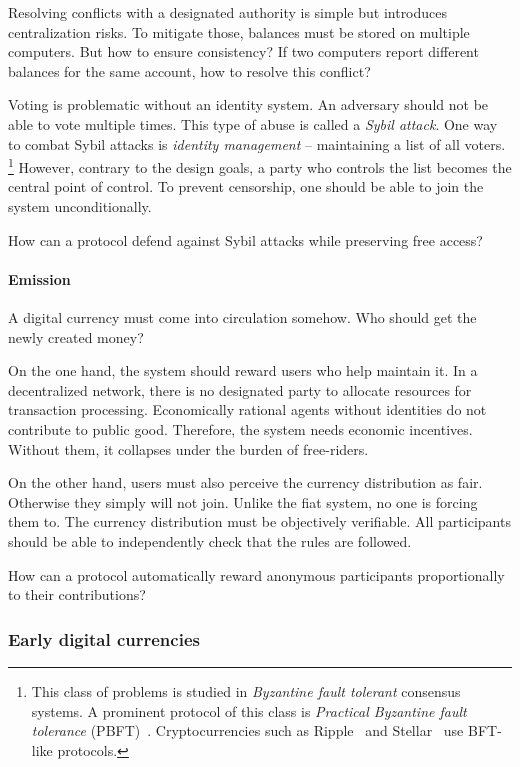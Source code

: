 Resolving conflicts with a designated authority is simple but introduces centralization risks.
To mitigate those, balances must be stored on multiple computers.
But how to ensure consistency?
If two computers report different balances for the same account, how to resolve this conflict?

Voting is problematic without an identity system.
An adversary should not be able to vote multiple times.
This type of abuse is called a \textit{Sybil attack}.
One way to combat Sybil attacks is \textit{identity management} -- maintaining a list of all voters.
\footnote{This class of problems is studied in \textit{Byzantine fault tolerant} consensus systems.
A prominent protocol of this class is \textit{Practical Byzantine fault tolerance} (PBFT)~\cite{Castro2002}.
Cryptocurrencies such as Ripple~\cite{Schwartz2014} and Stellar~\cite{Mazieres2014} use BFT-like protocols.}
However, contrary to the design goals, a party who controls the list becomes the central point of control.
To prevent censorship, one should be able to join the system unconditionally.

How can a protocol defend against Sybil attacks while preserving free access?


\paragraph{Emission}

A digital currency must come into circulation somehow.
Who should get the newly created money?

On the one hand, the system should reward users who help maintain it.
In a decentralized network, there is no designated party to allocate resources for transaction processing.
Economically rational agents without identities do not contribute to public good.
Therefore, the system needs economic incentives.
Without them, it collapses under the burden of free-riders.

On the other hand, users must also perceive the currency distribution as fair.
Otherwise they simply will not join.
Unlike the fiat system, no one is forcing them to.
The currency distribution must be objectively verifiable.
All participants should be able to independently check that the rules are followed.

How can a protocol automatically reward anonymous participants proportionally to their contributions?


\subsubsection*{Early digital currencies}

